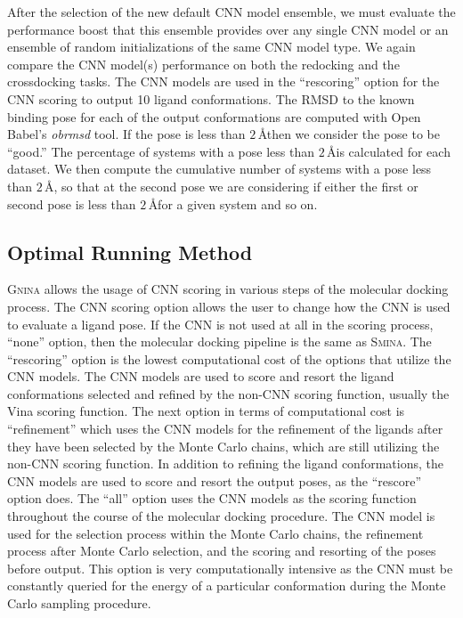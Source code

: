 \documentclass[journal=jcisd8,manuscript=article]{achemso}
\begin{document}
After the selection of the new default CNN model ensemble, we must evaluate the performance boost that this ensemble provides over any single CNN model or an ensemble of random initializations of the same CNN model type. We again compare the CNN model(s) performance on both the redocking and the crossdocking tasks. The CNN models are used in the ``rescoring'' option for the CNN scoring to output 10 ligand conformations. The RMSD to the known binding pose for each of the output conformations are computed with Open Babel's \textit{obrmsd} tool. If the pose is less than $2\,$\AA then we consider the pose to be ``good.'' The percentage of systems with a pose less than $2\,$\AA is calculated for each dataset. We then compute the cumulative number of systems with a pose less than $2\,$\AA, so that at the second pose we are considering if either the first or second pose is less than $2\,$\AA for a given system and so on.

\subsection{Optimal Running Method}
\textsc{Gnina} allows the usage of CNN scoring in various steps of the molecular docking process. The CNN scoring option allows the user to change how the CNN is used to evaluate a ligand pose. If the CNN is not used at all in the scoring process, ``none'' option, then the molecular docking pipeline is the same as \textsc{Smina}. The ``rescoring'' option is the lowest computational cost of the options that utilize the CNN models. The CNN models are used to score and resort the ligand conformations selected and refined by the non-CNN scoring function, usually the Vina scoring function. The next option in terms of computational cost is ``refinement'' which uses the CNN models for the refinement of the ligands after they have been selected by the Monte Carlo chains, which are still utilizing the non-CNN scoring function. In addition to refining the ligand conformations, the CNN models are used to score and resort the output poses, as the ``rescore'' option does. The ``all'' option uses the CNN models as the scoring function throughout the course of the molecular docking procedure. The CNN model is used for the selection process within the Monte Carlo chains, the refinement process after Monte Carlo selection, and the scoring and resorting of the poses before output. This option is very computationally intensive as the CNN must be constantly queried for the energy of a particular conformation during the Monte Carlo sampling procedure.
\end{document}
